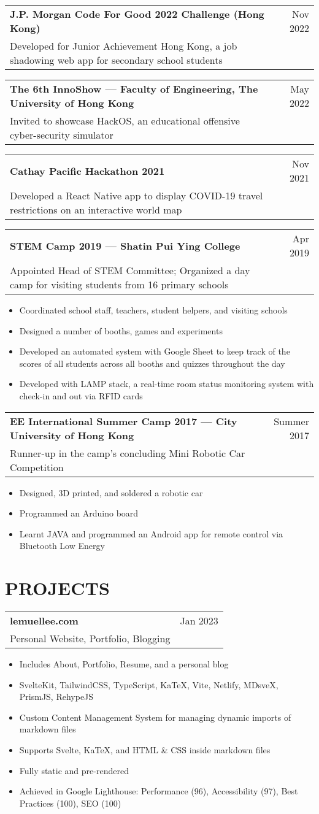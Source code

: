 \documentclass{article}
\makeatletter
\newcommand{\jobTitle}[3]{
    \vspace{0.3cm}
    \begin{tabular*}{1\textwidth}{||l@{\extracolsep{\fill}}r}
        \textbf{#1} & #2\\
        #3 &
    \end{tabular*}
}
\makeatother
\begin{document}
\jobTitle
{J.P. Morgan Code For Good 2022 Challenge (Hong Kong)}
{Nov 2022}
{Developed for Junior Achievement Hong Kong, a job shadowing web app for secondary school students}

\jobTitle
{The 6th InnoShow --- Faculty of Engineering, The University of Hong Kong}
{May 2022}
{Invited to showcase HackOS, an educational offensive cyber-security simulator}

\jobTitle
{Cathay Pacific Hackathon 2021}
{Nov 2021}
{Developed a React Native app to display COVID-19 travel restrictions on an interactive world map}

\jobTitle
{STEM Camp 2019 --- Shatin Pui Ying College}
{Apr 2019}
{Appointed Head of STEM Committee; Organized a day camp for visiting students from 16 primary schools}
\begin{itemize}
    \item Coordinated school staff, teachers, student helpers, and visiting schools
    \item Designed a number of booths, games and experiments
    \item Developed an automated system with Google Sheet to keep track of the scores of all students across all booths and quizzes throughout the day
    \item Developed with LAMP stack, a real-time room status monitoring system with check-in and out via RFID cards
\end{itemize}

\jobTitle
{EE International Summer Camp 2017 --- City University of Hong Kong}
{Summer 2017}
{Runner-up in the camp's concluding Mini Robotic Car Competition}
\begin{itemize}
    \item Designed, 3D printed, and soldered a robotic car
    \item Programmed an Arduino board
    \item Learnt JAVA and programmed an Android app for remote control via Bluetooth Low Energy
\end{itemize}

\section{PROJECTS}

\jobTitle
{lemuellee.com}
{Jan 2023}
{Personal Website, Portfolio, Blogging}
\begin{itemize}
    \item Includes About, Portfolio, Resume, and a personal blog
    \item SvelteKit, TailwindCSS, TypeScript, KaTeX, Vite, Netlify, MDsveX, PrismJS, RehypeJS
    \item Custom Content Management System for managing dynamic imports of markdown files
	\item Supports Svelte, KaTeX, and HTML \& CSS inside markdown files
	\item Fully static and pre-rendered
	\item Achieved in Google Lighthouse: Performance (96), Accessibility (97), Best Practices (100), SEO (100)
\end{itemize}
\end{document}
